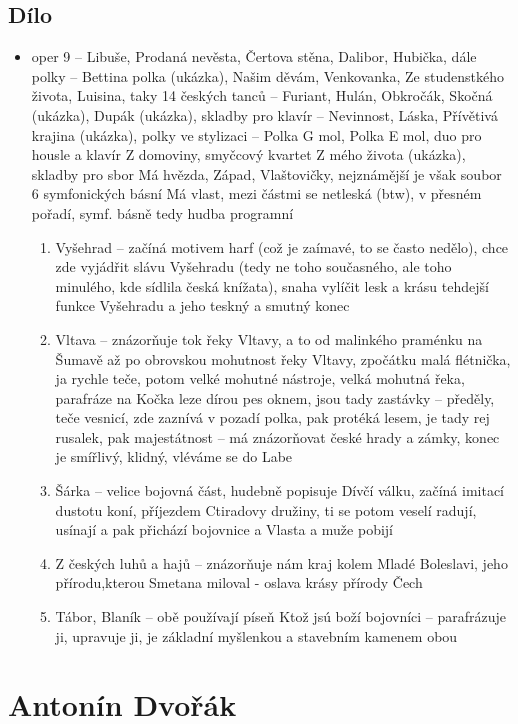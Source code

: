 \documentclass{article}
\begin{document}
\subsection{Dílo}
\begin{itemize}
  \item oper 9 -- Libuše, Prodaná nevěsta, Čertova stěna, Dalibor, Hubička, dále polky -- Bettina polka (ukázka), Našim děvám, Venkovanka, Ze studenstkého života, Luisina, taky 14 českých tanců -- Furiant, Hulán, Obkročák, Skočná (ukázka), Dupák (ukázka), skladby pro klavír -- Nevinnost, Láska, Přívětivá krajina (ukázka), polky ve stylizaci -- Polka G mol, Polka E mol, duo pro housle a klavír Z domoviny, smyčcový kvartet Z mého života (ukázka), skladby pro sbor Má hvězda, Západ, Vlaštovičky, nejznámější je však soubor 6 symfonických básní Má vlast, mezi částmi se netleská (btw), v přesném pořadí, symf. básně tedy hudba programní
  \begin{enumerate}
    \item Vyšehrad -- začíná motivem harf (což je zaímavé, to se často nedělo), chce zde vyjádřit slávu Vyšehradu (tedy ne toho současného, ale toho minulého, kde sídlila česká knížata), snaha vylíčit lesk a krásu tehdejší funkce Vyšehradu a jeho teskný a smutný konec
    \item Vltava -- znázorňuje tok řeky Vltavy, a to od malinkého praménku na Šumavě až po obrovskou mohutnost řeky Vltavy, zpočátku malá flétnička, ja rychle teče, potom velké mohutné nástroje, velká mohutná řeka, parafráze na Kočka leze dírou pes oknem, jsou tady zastávky -- předěly, teče vesnicí, zde zaznívá v pozadí polka, pak protéká lesem, je tady rej rusalek, pak majestátnost -- má znázorňovat české hrady a zámky, konec je smířlivý, klidný, vléváme se do Labe
    \item Šárka -- velice bojovná část, hudebně popisuje Dívčí válku, začíná imitací dustotu koní, příjezdem Ctiradovy družiny, ti se potom veselí radují, usínají a pak přichází bojovnice a Vlasta a muže pobijí
    \item Z českých luhů a hajů -- znázorňuje nám kraj kolem Mladé Boleslavi, jeho přírodu,kterou Smetana miloval - oslava krásy přírody Čech
    \item Tábor, Blaník -- obě používají píseň Ktož jsú boží bojovníci -- parafrázuje ji, upravuje ji, je základní myšlenkou a stavebním kamenem obou
  \end{enumerate}
\end{itemize}

\section{Antonín Dvořák}
\end{document}
